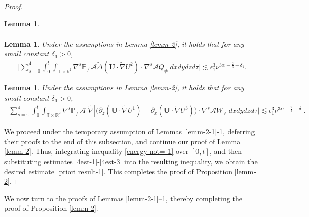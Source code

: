 \documentclass[11pt,reqno]{article}
\newtheorem{lemm}[theo]{Lemma}
\numberwithin{equation}{section}
\newcommand\R{{\mathbb R}}
\newcommand\T{{\mathbb T}}
\newcommand\PP{{\mathbb P}}
\newcommand\A{\mathcal{A}}
\newcommand\U{\bm{U}}
\let\pa=\partial
\let\al=\alpha
\let\f=\frac
\let\ep=\epsilon
\begin{document}
\begin{proof}
\begin{lemm}
\begin{align}
	\end{align}
\end{lemm}
\begin{lemm}\label{lemm-2-2}
	Under the assumptions in Lemma \ref{lemm-2}, it holds that for any small constant $\delta_1>0$,
	\begin{align}\label{4est-2}
		\big|\sum_{s=0}^{4}
		\int_0^t
		\int_{\T\times\R^2} \nabla^s\PP_{\not=}\A\widetilde{\Delta}(\U\cdot\widetilde{\nabla}U^2)
		\cdot
		\nabla^s\A Q_{\not=} \,dxdydzd\tau \Big|
		\lesssim \ep_1^3\nu^{3\al-\f23-\delta_1}.
	\end{align}
\end{lemm}
\begin{lemm}\label{lemm-2-3}
	Under the assumptions in Lemma \ref{lemm-2}, it holds that for any small constant $\delta_1>0$,
	\begin{align}\label{4est-3}
		\Big| \sum_{s=0}^{4}
		\int_0^t
		\int_{\T\times\R^2}
		\nabla^s\PP_{\not=}\A|\widetilde{\nabla}|\big(
		\pa_{z}(\U\cdot\widetilde{\nabla}U^1)-\pa_{x}(\U\cdot\widetilde{\nabla}U^3)
		\big)
		\cdot
		\nabla^s\A W_{\not=}
		\,dxdydzd\tau \Big|
		\lesssim \ep_1^3\nu^{3\al-\f23-\delta_1}.
	\end{align}
\end{lemm}

We proceed under the temporary assumption of Lemmas \ref{lemm-2-1}-\ref{lemm-2-3}, deferring their proofs to the end of this subsection, and continue our proof of Lemma \ref{lemm-2}. 
Thus, integrating inequality \eqref{energy-not=-1} over $[0,t]$, and then substituting estimates \eqref{4est-1}-\eqref{4est-3} into the resulting inequality, we obtain the desired estimate \eqref{priori result-1}.
This completes the proof of Proposition \ref{lemm-2}.
\end{proof}

We now turn to the proofs of Lemmas \ref{lemm-2-1}–\ref{lemm-2-3}, thereby completing the proof of Proposition \ref{lemm-2}.
\end{document}
